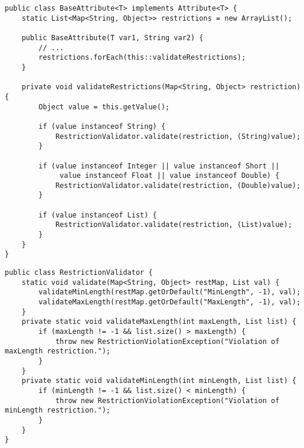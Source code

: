 \begin{minipage}{\linewidth}
\begin{lstlisting}[caption={BaseAttribute Rule Validation Restrictions},label={lst:baseattributeconstructor}]
public class BaseAttribute<T> implements Attribute<T> {
    static List<Map<String, Object>> restrictions = new ArrayList();

    public BaseAttribute(T var1, String var2) {
        // ...
        restrictions.forEach(this::validateRestrictions);
    }
    
    private void validateRestrictions(Map<String, Object> restriction){
        Object value = this.getValue();
        
        if (value instanceof String) {
            RestrictionValidator.validate(restriction, (String)value);
        }

        if (value instanceof Integer || value instanceof Short || 
             value instanceof Float || value instanceof Double) {
            RestrictionValidator.validate(restriction, (Double)value);
        }

        if (value instanceof List) {
            RestrictionValidator.validate(restriction, (List)value);
        }
    }
}
\end{lstlisting}
\end{minipage}

\bigskip


\begin{minipage}{\linewidth}
\begin{lstlisting}[caption={Restriction Validator Class (Simplified)},label={lst:restrictionvalidator}]
public class RestrictionValidator {
    static void validate(Map<String, Object> restMap, List val) {
        validateMinLength(restMap.getOrDefault("MinLength", -1), val);
        validateMaxLength(restMap.getOrDefault("MaxLength", -1), val);
    }
    private static void validateMaxLength(int maxLength, List list) {
        if (maxLength != -1 && list.size() > maxLength) {
            throw new RestrictionViolationException("Violation of maxLength restriction.");
        }
    }
    private static void validateMinLength(int minLength, List list) {
        if (minLength != -1 && list.size() < minLength) {
            throw new RestrictionViolationException("Violation of minLength restriction.");
        }
    }
}
\end{lstlisting}
\end{minipage}

